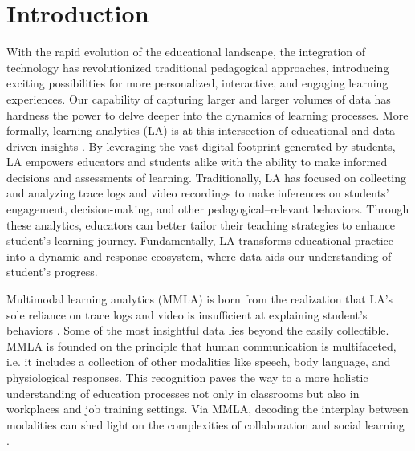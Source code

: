 \documentclass[manuscript,screen,review]{acmart}
\begin{document}
\section{Introduction} \label{sec:intro}

With the rapid evolution of the educational landscape, the integration of technology has revolutionized traditional pedagogical approaches, introducing exciting possibilities for more personalized, interactive, and engaging learning experiences. Our capability of capturing larger and larger volumes of data has hardness the power to delve deeper into the dynamics of learning processes. More formally, learning analytics (LA) is at this intersection of educational and data-driven insights \cite{}. By leveraging the vast digital footprint generated by students, LA empowers educators and students alike with the ability to make informed decisions and assessments of learning. Traditionally, LA has focused on collecting and analyzing trace logs and video recordings to make inferences on students' engagement, decision-making, and other pedagogical--relevant behaviors. Through these analytics, educators can better tailor their teaching strategies to enhance student's learning journey. Fundamentally, LA transforms educational practice into a dynamic and response ecosystem, where data aids our understanding of student's progress.

Multimodal learning analytics (MMLA) is born from the realization that LA's sole reliance on trace logs and video is insufficient at explaining student's behaviors \cite{}. Some of the most insightful data lies beyond the easily collectible. MMLA is founded on the principle that human communication is multifaceted, i.e. it includes a collection of other modalities like speech, body language, and physiological responses. This recognition paves the way to a more holistic understanding of education processes not only in classrooms but also in workplaces and job training settings. Via MMLA, decoding the interplay between modalities can shed light on the complexities of collaboration and social learning \cite{}.
\end{document}
